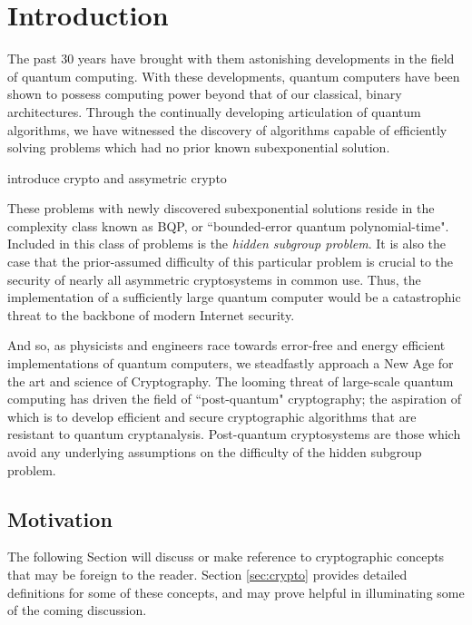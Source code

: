 \chapter{Introduction}

The past 30 years have brought with them astonishing developments in the field of quantum computing. With these developments, quantum computers have been shown to possess computing power beyond that of our classical, binary architectures. Through the continually developing articulation of quantum algorithms, we have witnessed the discovery of algorithms capable of efficiently solving problems which had no prior known subexponential solution. 

introduce crypto and assymetric crypto

These problems with newly discovered subexponential solutions reside in the complexity class known as BQP, or ``bounded-error quantum polynomial-time". Included in this class of problems is the \textit{hidden subgroup problem}. It is also the case that the prior-assumed difficulty of this particular problem is crucial to the security of nearly all asymmetric cryptosystems in common use. Thus, the implementation of a sufficiently large quantum computer would be a catastrophic threat to the backbone of modern Internet security.  

And so, as physicists and engineers race towards error-free and energy efficient implementations of quantum computers, we steadfastly approach a New Age for the art and science of Cryptography. The looming threat of large-scale quantum computing has driven the field of ``post-quantum" cryptography; the aspiration of which is to develop efficient and secure cryptographic algorithms that are resistant to quantum cryptanalysis. Post-quantum cryptosystems are those which avoid any underlying assumptions on the difficulty of the hidden subgroup problem.\\

\section{Motivation}
\label{sec:motivation}

The following Section will discuss or make reference to cryptographic concepts that may be foreign to the reader. Section  \ref{sec:crypto} provides detailed definitions for some of these concepts, and may prove helpful in illuminating some of the coming discussion.\\

